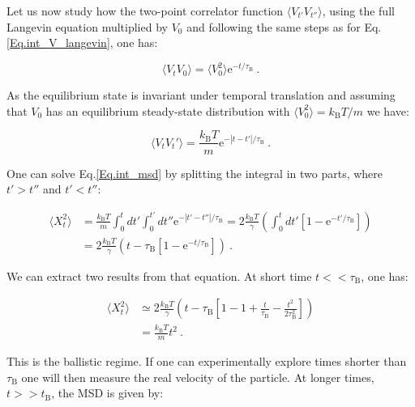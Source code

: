 Let us now study how the two-point correlator function $ \langle V_{t'}V_{t''} \rangle $, using the full Langevin equation multiplied by $V_0$ and following the same steps as for Eq.\ref{Eq.int_V_langevin}, one  has:

\begin{equation}
	\langle V_t V_0 \rangle = \langle V_0 ^2 \rangle \mathrm{e}^{-t/\tau_{\mathrm{B}}}~.
\end{equation}

As the equilibrium state is invariant under temporal translation and assuming that $V_0$ has an equilibrium steady-state distribution with $\langle V_0^2 \rangle = k_\mathrm{B} T / m$ we have:

\begin{equation}
	\langle V_t V_t' \rangle = \frac{k_\mathrm{B}T}{m} \mathrm{e}^{-|t-t'|/\tau_{\mathrm{B}}}~.
\end{equation}

One can solve Eq.\ref{Eq.int_msd} by splitting the integral in two parts, where $t'>t''$ and $ t' < t''$:

\begin{equation}
	\begin{aligned}
	\langle X_t ^2 \rangle & =    \frac{k_\mathrm{B}T}{m}  \int _0 ^t dt' \int _0 ^{t'} dt'' \mathrm{e} ^ {- |t' - t''| / \tau_\mathrm{B}} = 2 \frac{k_\mathrm{B}T}{\gamma} \left( \int_0 ^t dt' \left[1 - \mathrm{e}^{-t'/\tau_\mathrm{B}} \right] \right) \\
	& = 2 \frac{k_\mathrm{B} T}{\gamma} \left( t - \tau_\mathrm{B} \left[ 1 - \mathrm{e}^{-t/\tau_\mathrm{B}} \right] \right) ~.
	\end{aligned}
\end{equation}

We can extract two results from that equation. At short time $t << \tau_\mathrm{B}$, one has:

\begin{equation}
	\begin{aligned}
	\langle X_t ^2 \rangle & \simeq  2 \frac{k_\mathrm{B} T}{\gamma} \left( t - \tau_\mathrm{B} \left[ 1 - 1 + \frac{t}{\tau_\mathrm{B}} - \frac{t^2}{ 2 \tau_\mathrm{B} ^2}\right]         \right) \\
	& = \frac{k_\mathrm{B} T}{m} t^2 ~.
	\end{aligned}
	\label{Eq.shorttimemsd}
\end{equation}

This is the ballistic regime. If one can experimentally explore times shorter than $\tau _ \mathrm{B} $ one will then measure the real velocity of the particle. At longer times, $t >> t_\mathrm{B}$, the \gls{MSD} is given by:

